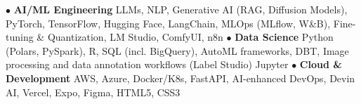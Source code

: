\documentclass[10pt,a4paper,sans]{moderncv} %
\begin{document}
{$\bullet$ \textbf{AI/ML Engineering} \hfill{} \newline \footnotesize LLMs, NLP, Generative AI (RAG, Diffusion Models), %
PyTorch, TensorFlow, Hugging Face, LangChain, %
MLOps (MLflow, W\&B),  Fine-tuning \& Quantization, LM Studio, ComfyUI, n8n\newline %
$\bullet$ \textbf{Data Science} \hfill{} \newline
\footnotesize Python (Polars, PySpark), R, SQL (incl. BigQuery), %
AutoML frameworks, DBT, Image processing and data annotation workflows (Label Studio) %
Jupyter \newline %
$\bullet$ \textbf{Cloud \& Development} \hfill{} \newline \footnotesize AWS, Azure, Docker/K8s, %
FastAPI, AI-enhanced DevOps, Devin AI, Vercel, Expo, Figma, HTML5, CSS3} %
\end{document}
